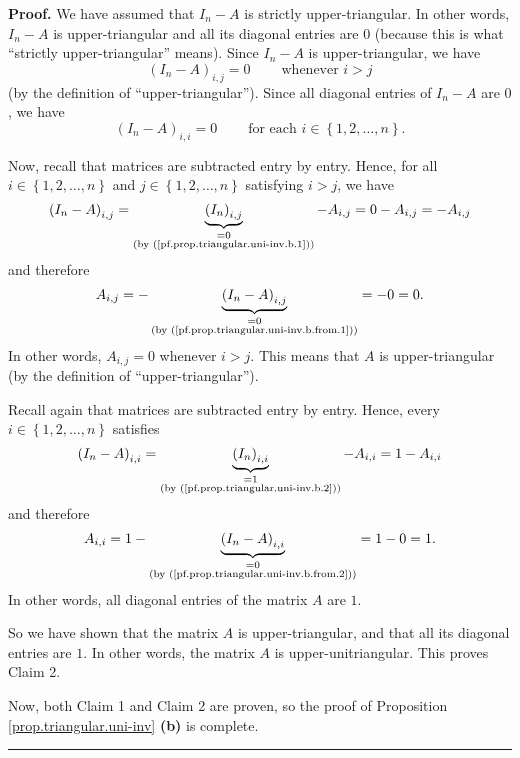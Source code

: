 \documentclass[numbers=enddot,12pt,final,onecolumn,notitlepage]{scrartcl}%
\theoremstyle{definition}
\newenvironment{proof}[1][Proof]{\noindent\textbf{#1.} }{\ \rule{0.5em}{0.5em}}
\begin{document}
\begin{proof}
We have assumed that $I_{n} - A$ is strictly upper-triangular. In other words,
$I_{n} - A$ is upper-triangular and all its diagonal entries are $0$ (because
this is what ``strictly upper-triangular'' means). Since $I_{n} - A$ is
upper-triangular, we have
\begin{equation}
\left(  I_{n} - A\right)  _{i, j} = 0 \ \ \ \ \ \ \ \ \ \ \text{whenever } i >
j \label{pf.prop.triangular.uni-inv.b.from.1}%
\end{equation}
(by the definition of ``upper-triangular''). Since all diagonal entries of
$I_{n} - A$ are $0$, we have
\begin{equation}
\left(  I_{n} - A\right)  _{i, i} = 0 \ \ \ \ \ \ \ \ \ \ \text{for each } i
\in\left\{  1,2,\ldots,n\right\}  .
\label{pf.prop.triangular.uni-inv.b.from.2}%
\end{equation}


Now, recall that matrices are subtracted entry by entry. Hence, for all $i
\in\left\{  1,2,\ldots,n\right\}  $ and $j \in\left\{  1,2,\ldots,n\right\}  $
satisfying $i > j$, we have
\[
\left(  I_{n} - A\right)  _{i, j} = \underbrace{\left(  I_{n}\right)  _{i,j}%
}_{\substack{= 0 \\\text{(by (\ref{pf.prop.triangular.uni-inv.b.1}))}}} -
A_{i, j} = 0 - A_{i, j} = - A_{i, j}%
\]
and therefore
\[
A_{i, j} = - \underbrace{\left(  I_{n} - A\right)  _{i,j}}_{\substack{= 0
\\\text{(by (\ref{pf.prop.triangular.uni-inv.b.from.1}))}}} = - 0 = 0 .
\]
In other words, $A_{i, j} = 0$ whenever $i > j$. This means that $A$ is
upper-triangular (by the definition of ``upper-triangular'').

Recall again that matrices are subtracted entry by entry. Hence, every $i
\in\left\{  1, 2, \ldots, n\right\}  $ satisfies
\[
\left(  I_{n} - A\right)  _{i, i} = \underbrace{\left(  I_{n}\right)  _{i,i}%
}_{\substack{= 1 \\\text{(by (\ref{pf.prop.triangular.uni-inv.b.2}))}}} -
A_{i, i} = 1 - A_{i, i}%
\]
and therefore
\[
A_{i, i} = 1 - \underbrace{\left(  I_{n} - A\right)  _{i,i}}_{\substack{= 0
\\\text{(by (\ref{pf.prop.triangular.uni-inv.b.from.2}))}}} = 1 - 0 = 1.
\]
In other words, all diagonal entries of the matrix $A$ are $1$.

So we have shown that the matrix $A$ is upper-triangular, and that all its
diagonal entries are $1$. In other words, the matrix $A$ is
upper-unitriangular. This proves Claim 2.

Now, both Claim 1 and Claim 2 are proven, so the proof of Proposition
\ref{prop.triangular.uni-inv} \textbf{(b)} is complete.
\end{proof}
\end{document}
